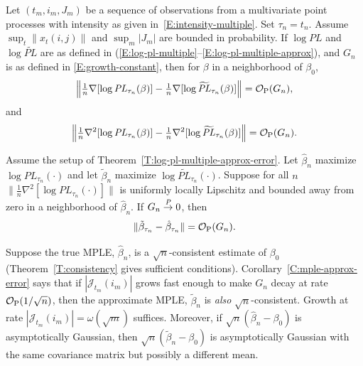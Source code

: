 \documentclass[aoas,preprint]{imsart}
\begin{document}
\begin{theorem}\label{T:log-pl-multiple-approx-error}
    Let $(t_m, i_m, J_m)$ be a sequence of observations from a multivariate
    point processes with intensity as given in~\eqref{E:intensity-multiple}.
    Set $\tau_n = t_n$.  Assume
    \(
        \sup_t \| x_t (i,j) \|
    \)
    and
    \(
        \sup_m | J_m |
    \)
    are bounded in probability.  
    If $\log \mathit{PL}$ and $\log \widetilde{\mathit{PL}}$ are as
    defined in
    \textnormal{(}\ref{E:log-pl-multiple}--\ref{E:log-pl-multiple-approx}\textnormal{)},
    and $G_n$ is as defined in \eqref{E:growth-constant},
    then for $\beta$ in a neighborhood of $\beta_0$,
    \[
        \Big\|
        \tfrac{1}{n}
        \nabla [\log \mathit{PL}_{\tau_n}(\beta) ]
        -
        \tfrac{1}{n}
        \nabla [\log \widetilde{\mathit{PL}}_{\tau_n}(\beta) ]
        \Big\|
            =
            \mathcal{O}_\text{P}(G_n),
    \]
    and
    \[
        \Big\|
        \tfrac{1}{n}
        \nabla^2 [\log \mathit{PL}_{\tau_n}(\beta) ]
        -
        \tfrac{1}{n}
        \nabla^2 [\log \widetilde{\mathit{PL}}_{\tau_n}(\beta) ]
        \Big\|
            =
            \mathcal{O}_\text{P}(G_n).
    \]
\end{theorem}
\begin{corollary}\label{C:mple-approx-error}
    Assume the setup of Theorem~\ref{T:log-pl-multiple-approx-error}.
    Let $\hat \beta_n$ maximize $\log \mathit{PL}_{\tau_n}(\cdot)$
    and let $\tilde \beta_n$ maximize
    $\log \widetilde{\mathit{PL}}_{\tau_n}(\cdot)$. 
    Suppose for all $n$
    \(
        \|
        \tfrac{1}{n}
        \nabla^2
        [ \log \mathit{PL}_{\tau_n}(\cdot)]
        \|
    \)
    is uniformly locally Lipschitz and bounded away from zero
    in a neighborhood of $\hat \beta_n$.
    If $G_n \overset{\mathit{P}}{\to} 0$, then
    \[
        \| \tilde \beta_{\tau_n} - \hat \beta_{\tau_n} \|
            =
            \mathcal{O}_\text{P}(G_n).
    \]
\end{corollary}

Suppose the true MPLE, $\hat \beta_n$, is a $\sqrt{n}$-consistent estimate of
$\beta_0$ (Theorem~\ref{T:consistency} gives sufficient conditions).  
Corollary~\ref{C:mple-approx-error} says that if
$|\mathcal{J}_{t_m}(i_m)|$ grows fast enough to make $G_n$ decay at rate
$\mathcal{O}_\text{P}(1/\sqrt{n})$, then the approximate MPLE, $\tilde \beta_n$ is \emph{also}
$\sqrt{n}$-consistent.  Growth at rate
$|\mathcal{J}_{t_m}(i_m)| = \omega(\sqrt{m})$ suffices.
Moreover, if $\sqrt{n}(\hat \beta_n - \beta_0)$ is asymptotically Gaussian, 
then $\sqrt{n}(\tilde \beta_n - \beta_0)$ is asymptotically Gaussian with
the same covariance matrix but possibly a different mean.
\end{document}
